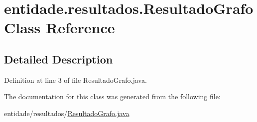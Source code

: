 \hypertarget{classentidade_1_1resultados_1_1ResultadoGrafo}{}\section{entidade.\+resultados.\+Resultado\+Grafo Class Reference}
\label{classentidade_1_1resultados_1_1ResultadoGrafo}


\subsection{Detailed Description}


Definition at line 3 of file Resultado\+Grafo.\+java.



The documentation for this class was generated from the following file\+:\begin{DoxyCompactItemize}
\item 
entidade/resultados/\hyperlink{ResultadoGrafo_8java}{Resultado\+Grafo.\+java}\end{DoxyCompactItemize}
